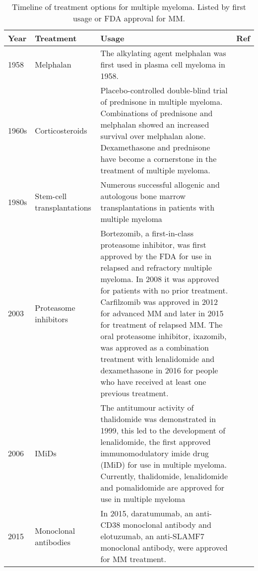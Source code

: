 

\begin{table}[h]
\centering
\begin{tabular}{|p{1cm}|p{3cm}|p{8cm}|p{1.3cm}|}
\hline
\textbf{Year} & \textbf{Treatment} & \textbf{Usage} & \textbf{Ref} \\ \hline
1958 & Melphalan & The alkylating agent melphalan was first used in plasma cell myeloma in 1958. & \cite{blokhin1958clinical} \\ \hline
1960s & Corticosteroids & Placebo-controlled double-blind trial of prednisone in multiple myeloma. Combinations of prednisone and melphalan showed an increased survival over melphalan alone. Dexamethasone and prednisone have become a cornerstone in the treatment of multiple myeloma. & \cite{mass1962comparison, alexanian1969treatment} \\ \hline
1980s & Stem-cell transplantations & Numerous successful allogenic and autologous bone marrow transplantations in patients with multiple myeloma &  \cite{mcelwain1983high, osserman1982identical, fefer1986identical, gahrton1987bone}  \\ \hline
2003 & Proteasome inhibitors & Bortezomib, a first-in-class proteasome inhibitor, was first approved by the FDA for use in relapsed and refractory multiple myeloma. In 2008 it was approved for patients with no prior treatment. Carfilzomib was approved in 2012 for advanced MM and later in 2015 for treatment of relapsed MM. The oral proteasome inhibitor, ixazomib, was approved as a combination treatment with lenalidomide and dexamethasone in 2016 for people who have received at least one previous treatment. & \cite{kane2003velcade,richardson2003phase,katsnelson2012next} \\ \hline
2006 & IMiDs & The antitumour activity of thalidomide was demonstrated in 1999, this led to the development of lenalidomide, the first approved immunomodulatory imide drug (IMiD) for use in multiple myeloma. Currently, thalidomide, lenalidomide and pomalidomide are approved for use in multiple myeloma & \cite{singhal1999antitumor,label47revlimid,san2013pomalidomide} \\ \hline
2015 & Monoclonal antibodies & In 2015, daratumumab, an anti-CD38 monoclonal antibody and elotuzumab, an anti-SLAMF7 monoclonal antibody, were approved for MM treatment. & \cite{lokhorst2015targeting,lonial2015elotuzumab} \\ \hline
\end{tabular}
\caption[Timeline of treatment options for multiple myeloma]{Timeline of treatment options for multiple myeloma. Listed by first usage or FDA approval for MM.}
\label{tab:treatment_history}
\end{table}


